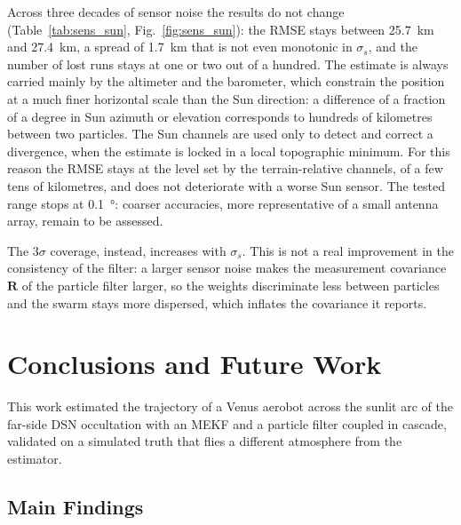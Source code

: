 \documentclass[preprint,12pt,a4paper]{elsarticle}
\begin{document}
Across three decades of sensor noise the results do not change (Table~\ref{tab:sens_sun},
Fig.~\ref{fig:sens_sun}): the RMSE stays between \SI{25.7}{km} and \SI{27.4}{km}, a spread
of \SI{1.7}{km} that is not even monotonic in $\sigma_s$, and the number of lost runs stays
at one or two out of a hundred.
The estimate is always carried mainly by the altimeter and
the barometer, which constrain the position at a much finer horizontal scale than the Sun
direction: a difference of a fraction of a degree in Sun azimuth or elevation corresponds to
hundreds of kilometres between two particles.
The Sun channels are used only to detect and correct a divergence, when the estimate is
locked in a local topographic minimum.
For this reason the RMSE stays at the level set by the terrain-relative channels, of a few
tens of kilometres, and does not deteriorate with a worse Sun sensor.
The tested range stops at \SI{0.1}{\degree}: coarser accuracies, more representative of a
small antenna array, remain to be assessed.

The $3\sigma$ coverage, instead, increases with $\sigma_s$.
This is not a real improvement in the consistency of the filter: a larger sensor noise
makes the measurement covariance $\mathbf{R}$ of the particle filter larger, so the weights
discriminate less between particles and the swarm stays more dispersed, which inflates the
covariance it reports.

\section{Conclusions and Future Work}\label{sec:conclusions}

This work estimated the trajectory of a Venus aerobot across the sunlit arc of the far-side
DSN occultation with an MEKF and a particle filter coupled in cascade, validated on a
simulated truth that flies a different atmosphere from the estimator.

\subsection{Main Findings}
\end{document}
